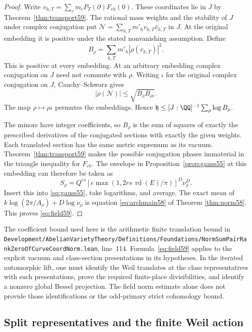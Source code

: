 \documentclass[a4paper,11pt]{article}
\theoremstyle{definition}
\theoremstyle{remark}
\newcommand{\srcloc}[2]{{\small\nolinkurl{#1.lean}}, line~#2}
\numberwithin{equation}{section}
\begin{document}
\begin{proof}
Write \(v_{h,T}=\sum_c m_cP_T(\partial)F_{ch}(0)\).
These coordinates lie in \(J\) by Theorem~\ref{thm:transport59}.
The rational mass weights and the stability of \(J\) under complex
conjugation put \(\mathcal N=\sum_{h,T}m'_h v_{h,T}\bar v_{h,T}\)
in \(J\). At the original embedding it is positive under the
stated nonvanishing assumption. Define
\[
              B_\rho=\sum_{h,T}m'_h|\rho(v_{h,T})|^2 .
\]
This is positive at every embedding. At an arbitrary embedding
complex conjugation on \(J\) need not commute with \(\rho\).
Writing \(\iota\) for the original complex conjugation on \(J\),
Cauchy--Schwarz gives
\[
          |\rho(\mathcal N)|\le \sqrt{B_\rho B_{\rho\iota}}.
\]
The map \(\rho\mapsto\rho\iota\) permutes the embeddings. Hence
\(\mathfrak h\le[J:\QQ]^{-1}\sum_\rho\log B_\rho\).

The minors have integer coefficients, so \(B_\rho\) is the
sum of squares of exactly the prescribed derivatives of the
conjugated sections with exactly the given weights. Each
translated section has the same metric supremum as its vacuum.
Theorem~\ref{thm:transport59} makes the possible conjugation
phases immaterial in the triangle inequality for \(F_{ch}\).
The envelope in Proposition~\ref{prop:gauss55} at this embedding
can therefore be taken as
\[
 S_\rho=Q^{rs}[e\max(1,2rs\,\operatorname{rd}(E)/\pi)]^D\nu_\rho^D .
\]
Insert this into \eqref{eq:gauss55}, take logarithms, and average.
The exact mean of \(k\log(2\pi/A_\rho)+D\log\nu_\rho\) is
equation \eqref{eq:archmain58} of
Theorem \ref{thm:norm58}.
This proves \eqref{eq:field59}.
\end{proof}

The coefficient bound used here is the arithmetic finite
translation bound in
\srcloc{Development/AbelianVarietyTheory/Definitions/Foundations/NormSumPairRankZeroOfCurveCoordNorm}{114}.
Formula~\eqref{eq:field59} applies to the explicit vacuum and
class-section presentations in its hypotheses. In the iterated
automorphic lift, one must identify the Weil translates at the
class representatives with such presentations, prove the required
finite-place divisibilities, and identify a nonzero global Bessel
projection. The field norm estimate alone does not provide those
identifications or the odd-primary strict cohomology bound.

\subsection{Split representatives and the finite Weil action}\label{nav:V-13}
\label{sec:split61}
\end{document}
